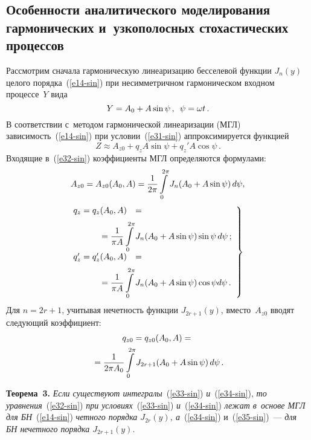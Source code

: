 \begin{multicols}{2}
\section{Особенности аналитического моделирования гармонических 
и~узкополосных стохастических процессов}

Рассмотрим сначала гармоническую линеаризацию бесселевой функции $J_n (y)$ 
целого порядка~(\ref{e14-sin})
при несимметричном гармоническом входном процессе~$Y$ вида
\begin{equation}
Y= A_0 + A \sin \psi\,, \enskip \psi =\omega t\,.
\label{e31-sin}
\end{equation}
В соответствии с~методом гармонической линеаризации (МГЛ)~\cite{8-sin} 
зависимость~(\ref{e14-sin}) при условии~(\ref{e31-sin}) аппроксимируется функцией
\begin{equation}
Z\approx A_{z0} + q_z A\sin \psi + q_z' A\cos \psi\,.
\label{e32-sin}
\end{equation}
Входящие в~(\ref{e32-sin}) коэффициенты МГЛ определяются формулами:
\begin{equation}
\hspace*{-2mm}A_{z0} = A_{z0} (A_0, A) = \fr{1}{2\pi} \iii_0^{2\pi} J_n 
(A_0+ A\sin \psi)\, d\psi,\!\!\!
\label{e33-sin}
\end{equation}
\begin{equation}
\left.
\begin{array}{rl}
\hspace*{-2mm}q_z=q_z(A_0, A) &={}\\[6pt]
&\hspace*{-15mm}{}=\displaystyle \fr{1}{\pi A} \iii_0^{2\pi} J_n (A_0+A\sin \psi) \sin \psi\, d\psi\,;\\[6pt]
\hspace*{-2mm}q_z'=q_z'(A_0, A) &={}\\[6pt]
&\hspace*{-15mm}{}=\displaystyle \fr{1}{\pi A} \iii_0^{2\pi} J_n (A_0+A\sin \psi) \cos \psi d\psi\,.
\end{array}
\right\}
\label{e34-sin}
\end{equation}
Для $n=2r+1$, учитывая нечетность функции $J_{2r+1} (y)$, вместо~$A_{z0}$ 
вводят следующий коэффициент:
\begin{multline}
q_{z0} = q_{z0} ( A_0, A) = {}\\
{}=\displaystyle\frac{\displaystyle 1\mathstrut}{\displaystyle 2\pi A_0\mathstrut} \int\limits_0^{2\pi} J_{2r+1} 
(A_0 + A\sin \psi)\, d\psi\,.\label{e35-sin}
\end{multline}

\noindent
\textbf{Теорема~3.} \textit{Если существуют интегралы}~(\ref{e33-sin}) 
\textit{и}~(\ref{e34-sin}), \textit{то уравнения}~(\ref{e32-sin}) 
\textit{при условиях}~(\ref{e33-sin}) \textit{и}~(\ref{e34-sin}) 
\textit{лежат в~основе МГЛ для БН}~(\ref{e14-sin}) 
\textit{четного порядка $J_{2r} (y)$, а}~(\ref{e34-sin}) и~(\ref{e35-sin})~--- 
\textit{для БН нечетного порядка $J_{2r+1}(y)$}.


\end{multicols}
